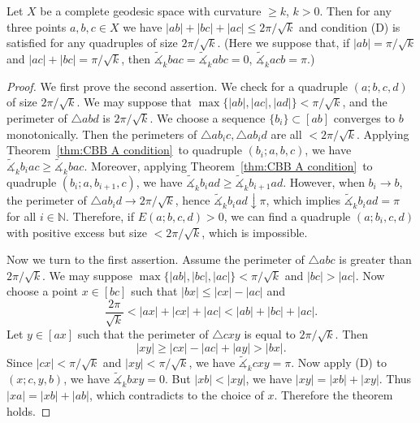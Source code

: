 \begin{thm}\label{thm:perimeter}
    Let $X$ be a complete geodesic space with curvature $\geq k$, $k>0$.
    Then for any three points $a,b,c\in X$ we have $|ab|+|bc|+|ac|\leq 2\pi/\sqrt{k}$ and condition {\rm (D)} is satisfied for any quadruples of size $2\pi/\sqrt{k}$.
    (Here we suppose that, if $|ab|=\pi/\sqrt{k}$ and $|ac|+|bc|=\pi/\sqrt{k}$, then $\tilde{\measuredangle}_kbac=\tilde{\measuredangle}_kabc=0$, $\tilde{\measuredangle}_kacb=\pi$.)
\end{thm}
\begin{proof}
    We first prove the second assertion.
    We check for a quadruple $(a;b,c,d)$ of size $2\pi/\sqrt{k}$.
    We may suppose that $\max\{|ab|,|ac|,|ad|\}<\pi/\sqrt{k}$, and the perimeter of $\triangle{abd}$ is $2\pi/\sqrt{k}$.
    We choose a sequence $\{b_i\}\subset[ab]$ converges to $b$ monotonically.
    Then the perimeters of $\triangle{ab_ic},\triangle{ab_id}$ are all $<2\pi/\sqrt{k}$.
    Applying Theorem~\ref{thm:CBB A condition}~to quadruple $(b_i;a,b,c)$, we have $\tilde{\measuredangle}_kb_iac\geq\tilde{\measuredangle}_kbac$.
    Moreover, applying Theorem~\ref{thm:CBB A condition}~to quadruple $(b_i;a,b_{i+1},c)$, we have $\tilde{\measuredangle}_kb_iad\geq\tilde{\measuredangle}_kb_{i+1}ad$.
    However, when $b_i\to b$, the perimeter of $\triangle{ab_id}\to 2\pi/\sqrt{k}$, hence $\tilde{\measuredangle}_kb_iad\downarrow\pi$, which implies $\tilde{\measuredangle}_kb_iad=\pi$ for all $i\in\mathbb{N}$.
    Therefore, if $E(a;b,c,d)>0$, we can find a quadruple $(a;b_i,c,d)$ with positive excess but size $<2\pi/\sqrt{k}$, which is impossible.

    Now we turn to the first assertion.
    Assume the perimeter of $\triangle{abc}$ is greater than $2\pi/\sqrt{k}$.
    We may suppose $\max\{|ab|,|bc|,|ac|\}<\pi/\sqrt{k}$ and $|bc|>|ac|$.
    Now choose a point $x\in[bc]$ such that $|bx|\leq|cx|-|ac|$ and
    \[\frac{2\pi}{\sqrt{k}}<|ax|+|cx|+|ac|<|ab|+|bc|+|ac|.\]
    Let $y\in[ax]$ such that the perimeter of $\triangle{cxy}$ is equal to $2\pi/\sqrt{k}$.
    Then
    \[|xy|\geq|cx|-|ac|+|ay|>|bx|.\]
    Since $|cx|<\pi/\sqrt{k}$ and $|xy|<\pi/\sqrt{k}$, we have $\tilde{\measuredangle}_kcxy=\pi$.
    Now apply (D) to $(x;c,y,b)$, we have $\tilde{\measuredangle}_kbxy=0$.
    But $|xb|<|xy|$, we have $|xy|=|xb|+|xy|$.
    Thus $|xa|=|xb|+|ab|$, which contradicts to the choice of $x$.
    Therefore the theorem holds.
\end{proof}